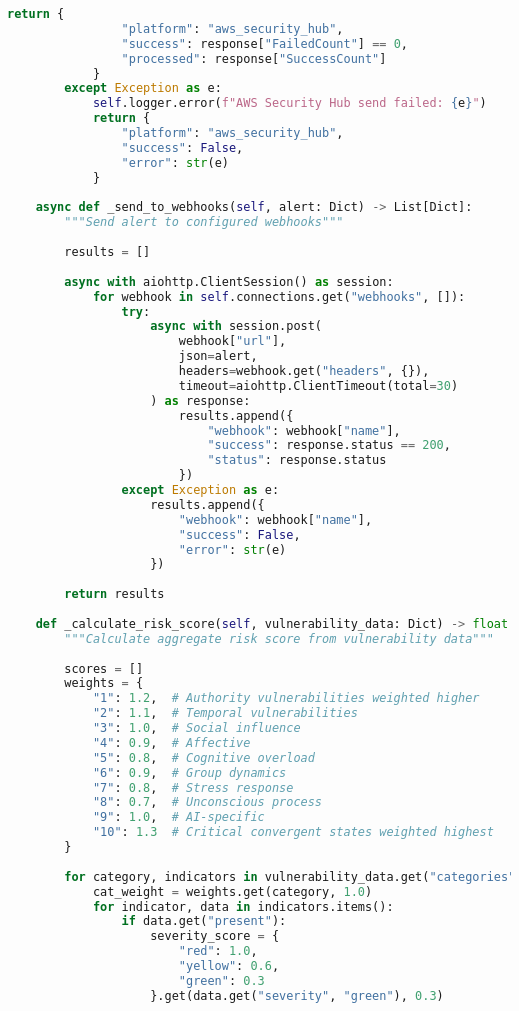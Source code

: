 \documentclass[11pt,a4paper]{article}
\begin{document}
\begin{lstlisting}[language=Python, caption=SIEM Integration Module]
            return {
                "platform": "aws_security_hub",
                "success": response["FailedCount"] == 0,
                "processed": response["SuccessCount"]
            }
        except Exception as e:
            self.logger.error(f"AWS Security Hub send failed: {e}")
            return {
                "platform": "aws_security_hub",
                "success": False,
                "error": str(e)
            }
    
    async def _send_to_webhooks(self, alert: Dict) -> List[Dict]:
        """Send alert to configured webhooks"""
        
        results = []
        
        async with aiohttp.ClientSession() as session:
            for webhook in self.connections.get("webhooks", []):
                try:
                    async with session.post(
                        webhook["url"],
                        json=alert,
                        headers=webhook.get("headers", {}),
                        timeout=aiohttp.ClientTimeout(total=30)
                    ) as response:
                        results.append({
                            "webhook": webhook["name"],
                            "success": response.status == 200,
                            "status": response.status
                        })
                except Exception as e:
                    results.append({
                        "webhook": webhook["name"],
                        "success": False,
                        "error": str(e)
                    })
        
        return results
    
    def _calculate_risk_score(self, vulnerability_data: Dict) -> float:
        """Calculate aggregate risk score from vulnerability data"""
        
        scores = []
        weights = {
            "1": 1.2,  # Authority vulnerabilities weighted higher
            "2": 1.1,  # Temporal vulnerabilities
            "3": 1.0,  # Social influence
            "4": 0.9,  # Affective
            "5": 0.8,  # Cognitive overload
            "6": 0.9,  # Group dynamics
            "7": 0.8,  # Stress response
            "8": 0.7,  # Unconscious process
            "9": 1.0,  # AI-specific
            "10": 1.3  # Critical convergent states weighted highest
        }
        
        for category, indicators in vulnerability_data.get("categories", {}).items():
            cat_weight = weights.get(category, 1.0)
            for indicator, data in indicators.items():
                if data.get("present"):
                    severity_score = {
                        "red": 1.0,
                        "yellow": 0.6,
                        "green": 0.3
                    }.get(data.get("severity", "green"), 0.3)
                    

\end{lstlisting}
\end{document}
